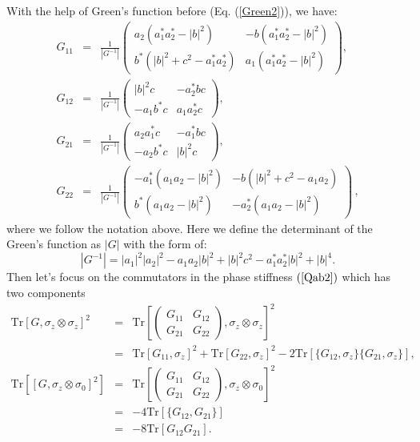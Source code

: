 \documentclass[aps,superscriptaddress,notitlepage,longbibliography]{revtex4-1}
\begin{document}
With the help of Green's function before (Eq. (\ref{Green2})), we
have: 
\begin{eqnarray}
G_{11} & = & \frac{1}{|G^{-1}|}\left(\begin{array}{cc}
a_{2}(a_{1}^{\ast}a_{2}^{\ast}-|b|^{2}) & -b(a_{1}^{\ast}a_{2}^{\ast}-|b|^{2})\\
b^{\ast}(|b|^{2}+c^{2}-a_{1}^{\ast}a_{2}^{\ast}) & a_{1}(a_{1}^{\ast}a_{2}^{\ast}-|b|^{2})
\end{array}\right),\\
G_{12} & = & \frac{1}{|G^{-1}|}\left(\begin{array}{cc}
|b|^{2}c & -a_{2}^{\ast}bc\\
-a_{1}b^{\ast}c & a_{1}a_{2}^{\ast}c
\end{array}\right),\\
G_{21} & = & \frac{1}{|G^{-1}|}\left(\begin{array}{cc}
a_{2}a_{1}^{\ast}c & -a_{1}^{\ast}bc\\
-a_{2}b^{\ast}c & |b|^{2}c
\end{array}\right),\\
G_{22} & = & \frac{1}{|G^{-1}|}\left(\begin{array}{cc}
-a_{1}^{\ast}(a_{1}a_{2}-|b|^{2}) & -b(|b|^{2}+c^{2}-a_{1}a_{2})\\
b^{\ast}(a_{1}a_{2}-|b|^{2}) & -a_{2}^{\ast}(a_{1}a_{2}-|b|^{2})
\end{array}\right)\,,
\end{eqnarray}
where we follow the notation above. Here we define the determinant
of the Green's function as $|G|$ with the form of: 
\begin{equation}
|G^{-1}|=|a_{1}|^{2}|a_{2}|^{2}-a_{1}a_{2}|b|^{2}+|b|^{2}c^{2}-a_{1}^{\ast}a_{2}^{\ast}|b|^{2}+|b|^{4}.\label{deter}
\end{equation}
Then let's focus on the commutators in the phase stiffness $\left(\ref{Qab2}\right)$
which has two components 
\begin{eqnarray}
\text{Tr}[G,\sigma_{z}\otimes\sigma_{z}]^{2} & = & \text{Tr}\left[\left(\begin{array}{cc}
G_{11} & G_{12}\\
G_{21} & G_{22}
\end{array}\right),\sigma_{z}\otimes\sigma_{z}\right]^{2}\nonumber \\
 & = & \text{Tr}[G_{11},\sigma_{z}]^{2}+\text{Tr}[G_{22},\sigma_{z}]^{2}-2\text{Tr}[\{G_{12},\sigma_{z}\}\{G_{21},\sigma_{z}\}],\\
\text{Tr}[[G,\sigma_{z}\otimes\sigma_{0}]^{2}] & = & \text{Tr}\left[\left(\begin{array}{cc}
G_{11} & G_{12}\\
G_{21} & G_{22}
\end{array}\right),\sigma_{z}\otimes\sigma_{0}\right]^{2}\nonumber \\
 & = & -4\text{Tr}[\{G_{12},G_{21}\}]\nonumber \\
 & = & -8\text{Tr}[G_{12}G_{21}].
\end{eqnarray}
\end{document}
